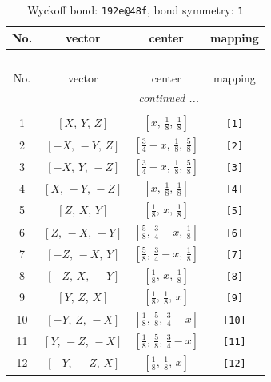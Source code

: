 \documentclass[fleqn,8pt]{jsarticle}
\begin{document}
\begin{longtable}{cccc}
\caption{Wyckoff bond: {\tt 192e@48f}, bond symmetry: {\tt 1}}
 \\
 \hline \hline
No. & vector & center & mapping \\ \hline \endfirsthead

\multicolumn{3}{l}{\tablename\ \thetable{}} \\
 \hline \hline
No. & vector & center & mapping \\ \hline \endhead

 \hline \hline
\multicolumn{3}{r}{\footnotesize\it continued ...} \\ \endfoot

 \hline \hline
\multicolumn{3}{r}{} \\ \endlastfoot

1 & $\left[ X,\, Y,\, Z \right]$ & $\left[ x,\, \frac{1}{8},\, \frac{1}{8} \right]$ & {\tt [1]} \\ \hline
2 & $\left[ - X,\, - Y,\, Z \right]$ & $\left[ \frac{3}{4} - x,\, \frac{1}{8},\, \frac{5}{8} \right]$ & {\tt [2]} \\ \hline
3 & $\left[ - X,\, Y,\, - Z \right]$ & $\left[ \frac{3}{4} - x,\, \frac{1}{8},\, \frac{5}{8} \right]$ & {\tt [3]} \\ \hline
4 & $\left[ X,\, - Y,\, - Z \right]$ & $\left[ x,\, \frac{1}{8},\, \frac{1}{8} \right]$ & {\tt [4]} \\ \hline
5 & $\left[ Z,\, X,\, Y \right]$ & $\left[ \frac{1}{8},\, x,\, \frac{1}{8} \right]$ & {\tt [5]} \\ \hline
6 & $\left[ Z,\, - X,\, - Y \right]$ & $\left[ \frac{5}{8},\, \frac{3}{4} - x,\, \frac{1}{8} \right]$ & {\tt [6]} \\ \hline
7 & $\left[ - Z,\, - X,\, Y \right]$ & $\left[ \frac{5}{8},\, \frac{3}{4} - x,\, \frac{1}{8} \right]$ & {\tt [7]} \\ \hline
8 & $\left[ - Z,\, X,\, - Y \right]$ & $\left[ \frac{1}{8},\, x,\, \frac{1}{8} \right]$ & {\tt [8]} \\ \hline
9 & $\left[ Y,\, Z,\, X \right]$ & $\left[ \frac{1}{8},\, \frac{1}{8},\, x \right]$ & {\tt [9]} \\ \hline
10 & $\left[ - Y,\, Z,\, - X \right]$ & $\left[ \frac{1}{8},\, \frac{5}{8},\, \frac{3}{4} - x \right]$ & {\tt [10]} \\ \hline
11 & $\left[ Y,\, - Z,\, - X \right]$ & $\left[ \frac{1}{8},\, \frac{5}{8},\, \frac{3}{4} - x \right]$ & {\tt [11]} \\ \hline
12 & $\left[ - Y,\, - Z,\, X \right]$ & $\left[ \frac{1}{8},\, \frac{1}{8},\, x \right]$ & {\tt [12]} \\ \hline

\end{longtable}
\end{document}
